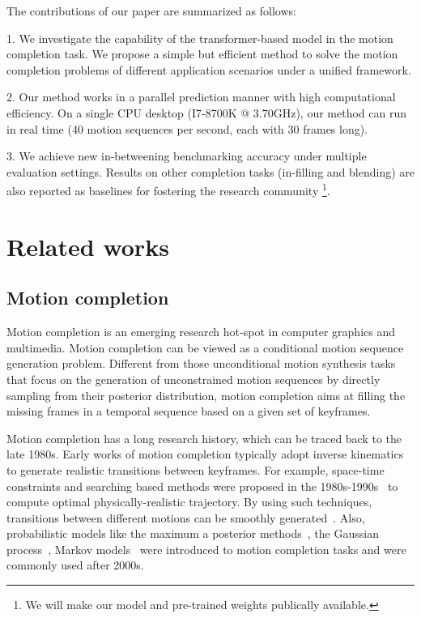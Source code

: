 \documentclass[10pt,twocolumn,letterpaper]{article}
\begin{document}
The contributions of our paper are summarized as follows:

1. We investigate the capability of the transformer-based model in the motion completion task. We propose a simple but efficient method to solve the motion completion problems of different application scenarios under a unified framework.

2. Our method works in a parallel prediction manner with high computational efficiency. On a single CPU desktop (I7-8700K @ 3.70GHz), our method can run in real time (40 motion sequences per second, each with 30 frames long).

3. We achieve new in-betweening benchmarking accuracy under multiple evaluation settings. Results on other completion tasks (in-filling and blending) are also reported as baselines for fostering the research community \footnote{We will make our model and pre-trained weights publically available.}.

\section{Related works}
\subsection{Motion completion}

Motion completion is an emerging research hot-spot in computer graphics and multimedia. Motion completion can be viewed as a conditional motion sequence generation problem. Different from those unconditional motion synthesis tasks~\cite{sidenbladh2002implicit,wang2007gaussian,taylor2007modeling} that focus on the generation of unconstrained motion sequences by directly sampling from their posterior distribution, motion completion aims at filling the missing frames in a temporal sequence based on a given set of keyframes. 

Motion completion has a long research history, which can be traced back to the late 1980s. Early works of motion completion typically adopt inverse kinematics to generate realistic transitions between keyframes. For example, space-time constraints and searching based methods were proposed in the 1980s-1990s~\cite{witkin1988spacetime,ngo1993spacetime} to compute optimal physically-realistic trajectory. By using such techniques, transitions between different motions can be smoothly generated~\cite{rose1996efficient}. Also, probabilistic models like the maximum a posterior methods~\cite{chai2007constraint,min2009interactive}, the Gaussian process~\cite{wang2007gaussian}, Markov models~\cite{lehrmann2014efficient} were introduced to motion completion tasks and were commonly used after 2000s. 
\end{document}
